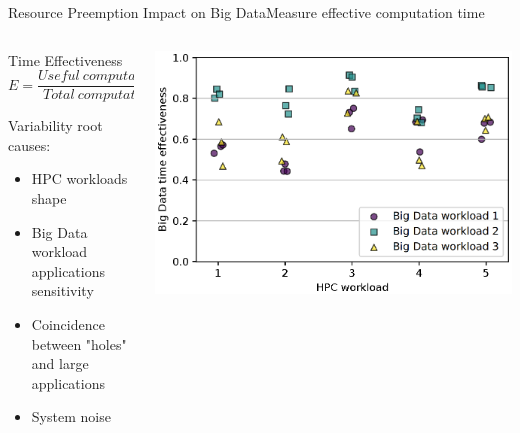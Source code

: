 \documentclass[10pt, compress, titleprogressbar, aspectratio=169]{beamer}
\begin{document}
        \begin{frame}{Resource Preemption Impact on Big Data}{Measure effective computation time}
            \begin{columns}
                \begin{column}{0.4\textwidth}
                    \begin{block}{Time Effectiveness}
                        $$E = \frac{Useful\ computation\ time}{Total\ computation\ time}$$
                    \end{block}

                    Variability root causes:
                    \begin{itemize}
                        \item HPC workloads shape
                        \item Big Data workload applications sensitivity
                        \item Coincidence between "holes" and large applications
                        \item System noise
                    \end{itemize}
                \end{column}
                \begin{column}{0.6\textwidth}
                    \begin{center}
                        \includegraphics[width=\linewidth, height=\textheight, keepaspectratio]{./img/fig/Big_data_effectiveness_sum}
                    \end{center}
                \end{column}
            \end{columns}
        \end{frame}
\end{document}
